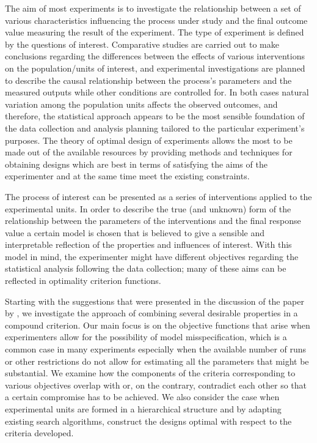 The aim of most experiments is to investigate the relationship between a set of various characteristics influencing the process under study and the final outcome value  measuring the result of the experiment. The type of experiment is defined by the questions of interest. Comparative studies are carried out to make conclusions regarding the differences between the effects of various interventions on the population/units of interest, and experimental investigations are planned to describe the causal relationship between the process's parameters and the measured outputs while other conditions are controlled for. In both cases natural variation among the population units affects the observed outcomes, and therefore, the statistical approach appears to be the most sensible foundation of the data collection and analysis planning tailored to the particular experiment's purposes. The theory of optimal design of experiments allows the most to be made out of the available resources by providing methods and techniques for obtaining designs which are best in terms of satisfying the aims of the experimenter and at the same time meet the existing constraints. 

The process of interest can be presented as a series of interventions applied to the experimental units. In order to describe the true (and unknown) form of the relationship between the parameters of the interventions and the final response value a certain model is chosen that is believed to give a sensible and interpretable reflection of the properties and influences of interest. With this model in mind, the experimenter might have different objectives regarding the statistical analysis following the data collection; many of these aims can be reflected in optimality criterion functions. 

Starting with the suggestions that were presented in the discussion of the paper by \cite{GilmourTrinca2012}, we investigate the approach of combining several desirable properties in a compound criterion. Our main focus is on the objective functions that arise when experimenters allow for the possibility of model misspecification, which is a common case in many experiments especially when the available number of runs or other restrictions do not allow for estimating all the parameters that might be substantial. We examine how the components of the criteria corresponding to various objectives overlap with or, on the contrary, contradict each other so that a certain compromise has to be achieved. We also consider the case when experimental units are formed in a hierarchical structure and by adapting existing search algorithms, construct the designs optimal with respect to the criteria developed. 

